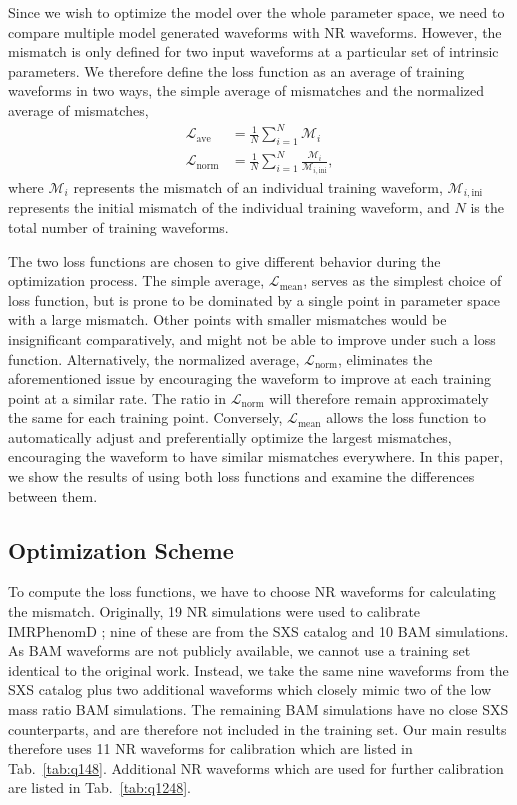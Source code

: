 \documentclass[twocolumn]{aastex631}
\begin{document}
Since we wish to optimize the model over the whole parameter space,
we need to compare multiple model generated waveforms with NR waveforms.
However, the mismatch is only defined for two input waveforms at a particular set of intrinsic parameters.
We therefore define the loss function as an average of training waveforms in two ways,
the simple average of mismatches and the normalized average of mismatches,  
\begin{align}\label{eqn:loss}
	\mathcal{L}_{\mathrm{ave}}&=\frac{1}{N}\sum_{i=1}^N\mathcal{M}_i \\
	\mathcal{L}_{\mathrm{norm}}&=\frac{1}{N}\sum_{i=1}^N\frac{\mathcal{M}_i}{\mathcal{M}_{i,\mathrm{ini}}},
\end{align}	
where $\mathcal{M}_i$ represents the mismatch of an individual training waveform,
$\mathcal{M}_{i,\mathrm{ini}}$ represents the initial mismatch of the individual
training waveform, and $N$ is the total number of training waveforms.

The two loss functions are chosen to give different 
behavior during the optimization process.
The simple average, $\mathcal{L}_{\mathrm{mean}}$, serves as the simplest choice of loss function,
but is prone to be dominated by a single point in parameter space with a large mismatch.
Other points with smaller mismatches would be insignificant comparatively, and might not be able 
to improve under such a loss function.
Alternatively, the normalized average, $\mathcal{L}_{\mathrm{norm}}$, eliminates the aforementioned issue
by encouraging the waveform to improve at each training point at a similar rate.
The ratio in $\mathcal{L}_{\mathrm{norm}}$ will therefore remain approximately the same for each training point.
Conversely, $\mathcal{L}_{\mathrm{mean}}$ allows the loss function to automatically adjust
and preferentially optimize the largest mismatches, encouraging the waveform to have similar mismatches everywhere.
In this paper, we show the results of using both loss functions 
and examine the differences between them. 

\subsection{Optimization Scheme} \label{subsec:optimization}

To compute the loss functions, we have to choose NR waveforms for calculating the mismatch.
Originally, 19 NR simulations were used to calibrate IMRPhenomD \citep{khan2016frequency}; nine of these 
are from the SXS catalog \citep{boyle2019sxs} and 10 BAM simulations. 
As BAM waveforms are not publicly available, we cannot use a training set identical to the original work.
Instead, we take the same nine waveforms from the SXS catalog plus two additional waveforms which closely mimic
two of the low mass ratio BAM simulations. 
The remaining BAM simulations have no close SXS counterparts, and are therefore not included in the training set.
Our main results therefore uses 11 NR waveforms for calibration which are listed in Tab.~\ref{tab:q148}.
Additional NR waveforms which are used for further calibration are listed in Tab.~\ref{tab:q1248}.  
\end{document}
